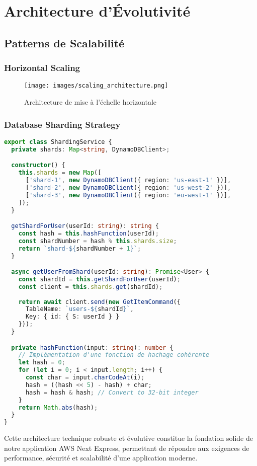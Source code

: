 \section{Architecture d'Évolutivité}

\subsection{Patterns de Scalabilité}

\subsubsection{Horizontal Scaling}

\begin{figure}[H]
    \centering
    \texttt{[image: images/scaling\_architecture.png]}
    \caption{Architecture de mise à l'échelle horizontale}
    \label{fig:scaling_architecture}
\end{figure}

\subsubsection{Database Sharding Strategy}

\begin{lstlisting}[language=TypeScript, caption=Stratégie de sharding]
export class ShardingService {
  private shards: Map<string, DynamoDBClient>;

  constructor() {
    this.shards = new Map([
      ['shard-1', new DynamoDBClient({ region: 'us-east-1' })],
      ['shard-2', new DynamoDBClient({ region: 'us-west-2' })],
      ['shard-3', new DynamoDBClient({ region: 'eu-west-1' })],
    ]);
  }

  getShardForUser(userId: string): string {
    const hash = this.hashFunction(userId);
    const shardNumber = hash % this.shards.size;
    return `shard-${shardNumber + 1}`;
  }

  async getUserFromShard(userId: string): Promise<User> {
    const shardId = this.getShardForUser(userId);
    const client = this.shards.get(shardId);
    
    return await client.send(new GetItemCommand({
      TableName: `users-${shardId}`,
      Key: { id: { S: userId } }
    }));
  }

  private hashFunction(input: string): number {
    // Implémentation d'une fonction de hachage cohérente
    let hash = 0;
    for (let i = 0; i < input.length; i++) {
      const char = input.charCodeAt(i);
      hash = ((hash << 5) - hash) + char;
      hash = hash & hash; // Convert to 32-bit integer
    }
    return Math.abs(hash);
  }
}
\end{lstlisting}

Cette architecture technique robuste et évolutive constitue la fondation solide de notre application AWS Next Express, permettant de répondre aux exigences de performance, sécurité et scalabilité d'une application moderne. 